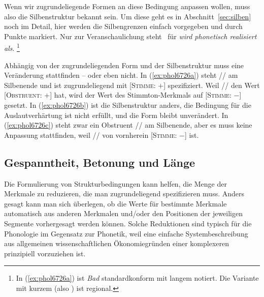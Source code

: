 Wenn wir zugrundeliegende Formen an diese Bedingung anpassen wollen, muss also die Silbenstruktur bekannt sein.
Um diese geht es in Abschnitt~\ref{sec:silben} noch im Detail, hier werden die Silbengrenzen einfach vorgegeben und durch Punkte markiert. 
Nur zur Veranschaulichung steht \phopro\ für \textit{wird phonetisch  realisiert als}.%
\footnote{In (\ref{ex:phol6726a}) ist \textit{Bad} standardkonform mit langem \textipa{[a:]} notiert.
Die Variante mit kurzem \textipa{[a]} (also \textipa{[bat]}) ist regional.}

\begin{exe}
  \ex\label{ex:phol6726}
  \begin{xlist}
  \end{xlist}
\end{exe}

Abhängig von der zugrundeliegenden Form und der Silbenstruktur muss eine Veränderung stattfinden -- oder eben nicht.
In (\ref{ex:phol6726a}) steht // am Silbenende und ist zugrundeliegend mit [\textsc{Stimme}: $+$] spezifiziert.
Weil // den Wert [\textsc{Obstruent}: $+$] hat, wird der Wert des Stimmton-Merkmals auf [\textsc{Stimme}: $-$] gesetzt.
In (\ref{ex:phol6726b}) ist die Silbenstruktur anders, die Bedingung für die Auslautverhärtung ist nicht erfüllt, und die Form bleibt unverändert.
In (\ref{ex:phol6726c}) steht zwar ein Obstruent // am Silbenende, aber es muss keine Anpassung stattfinden, weil // von vornherein [\textsc{Stimme}: $-$] ist.

\subsection{Gespanntheit, Betonung und Länge}

\label{sec:gespanntheitbetonunglaenge}

Die Formulierung von Strukturbedingungen kann helfen, die Menge der Merkmale zu reduzieren, die man zugrundeliegend spezifizieren muss.
Anders gesagt kann man sich überlegen, ob die Werte für bestimmte Merkmale automatisch aus anderen Merkmalen und\slash oder den Positionen der jeweiligen Segmente vorhergesagt werden können.
Solche Reduktionen sind typisch für die Phonologie im Gegensatz zur Phonetik, weil eine einfache Systembeschreibung aus allgemeinen wissenschaftlichen Ökonomiegründen einer komplexeren prinzipiell vorzuziehen ist.

